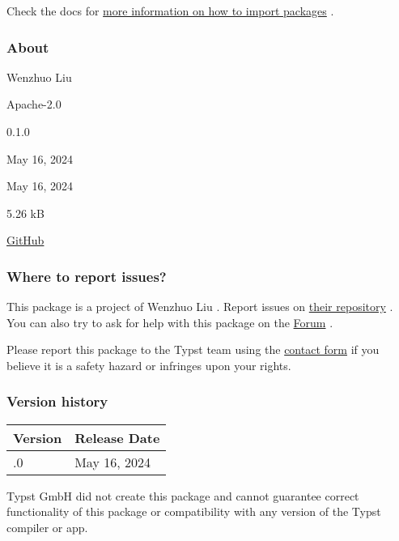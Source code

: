 Check the docs for
\href{https://typst.app/docs/reference/scripting/\#packages}{more
information on how to import packages} .

\subsubsection{About}\label{about}

\begin{description}
\tightlist
\item[Author :]
Wenzhuo Liu
\item[License:]
Apache-2.0
\item[Current version:]
0.1.0
\item[Last updated:]
May 16, 2024
\item[First released:]
May 16, 2024
\item[Archive size:]
5.26 kB
\href{https://packages.typst.org/preview/natrix-0.1.0.tar.gz}{\pandocbounded{}}
\item[Repository:]
\href{https://github.com/Enter-tainer/natrix}{GitHub}
\end{description}

\subsubsection{Where to report issues?}\label{where-to-report-issues}

This package is a project of Wenzhuo Liu . Report issues on
\href{https://github.com/Enter-tainer/natrix}{their repository} . You
can also try to ask for help with this package on the
\href{https://forum.typst.app}{Forum} .

Please report this package to the Typst team using the
\href{https://typst.app/contact}{contact form} if you believe it is a
safety hazard or infringes upon your rights.

\label{versions}
\subsubsection{Version history}\label{version-history}

\begin{longtable}[]{@{}ll@{}}
\toprule\noalign{}
Version & Release Date \\
\midrule\noalign{}
\endhead
\bottomrule\noalign{}
\endlastfoot
0.1.0 & May 16, 2024 \\
\end{longtable}

Typst GmbH did not create this package and cannot guarantee correct
functionality of this package or compatibility with any version of the
Typst compiler or app.
